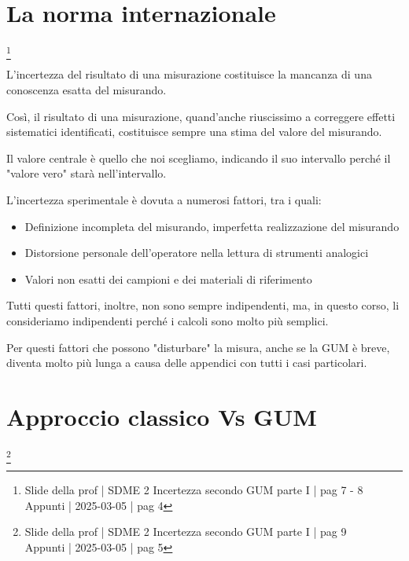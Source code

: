 \section{La norma internazionale}
\footnote{Slide della prof | SDME 2 Incertezza secondo GUM parte I | pag 7 - 8 \\  
Appunti | 2025-03-05 | pag 4}

L'incertezza del risultato di una misurazione costituisce la mancanza di una conoscenza esatta del misurando. \newline 

Così, il risultato di una misurazione, quand'anche riuscissimo a correggere effetti sistematici identificati, 
costituisce sempre una stima del valore del misurando. \newline 

Il valore centrale è quello che noi scegliamo, indicando il suo intervallo perché 
il "valore vero" starà nell'intervallo. \newline 

L'incertezza sperimentale è dovuta a numerosi fattori, tra i quali: 

\begin{itemize}
    \item Definizione incompleta del misurando, imperfetta realizzazione del misurando 
    \item Distorsione personale dell'operatore nella lettura di strumenti analogici 
    \item Valori non esatti dei campioni e dei materiali di riferimento
\end{itemize}

Tutti questi fattori, inoltre, non sono sempre indipendenti, ma, 
in questo corso, li consideriamo indipendenti perché i calcoli sono molto più semplici. \newline 

Per questi fattori che possono "disturbare" la misura, anche se la GUM è breve, 
diventa molto più lunga a causa delle appendici con tutti i casi particolari. \newline 

\newpage 

\section{Approccio classico Vs GUM}
\footnote{Slide della prof | SDME 2 Incertezza secondo GUM parte I | pag 9 \\  
Appunti | 2025-03-05 | pag 5}

